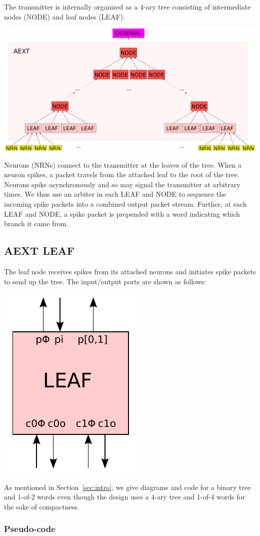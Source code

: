 \documentclass{article}
\begin{document}
The transmitter is internally organized as a 4-ary tree consisting of intermediate
nodes (NODE) and leaf nodes (LEAF).
\begin{center}
    \includegraphics[width=.7\textwidth]{img/aext.pdf}
\end{center}
Neurons (NRNs) connect to the transmitter at the leaves of the tree.
When a neuron spikes, a packet travels from the attached leaf to the root of 
the tree. Neurons spike asynchronously and so may signal the transmitter at 
arbitrary times. We thus use an arbiter in each LEAF and NODE to sequence the 
incoming spike packets into a combined output packet stream. Further, at each 
LEAF and NODE, a spike packet is prepended with a word indicating which 
branch it came from.

\subsection{AEXT LEAF \label{sec:AEXT_LEAF}}

The leaf node receives spikes from its attached neurons and initiates spike
packets to send up the tree. The input/output ports are shown as follows:

\begin{center}
  \includegraphics[width=.16\textwidth]{img/aext_leaf.pdf}
\end{center}

\noindent
As mentioned in Section~\ref{sec:intro}, 
we give diagrams and code for a binary tree and 1-of-2 words
even though the design uses a 4-ary tree and 1-of-4 words
for the sake of compactness.

\subsubsection*{Pseudo-code}
\end{document}
